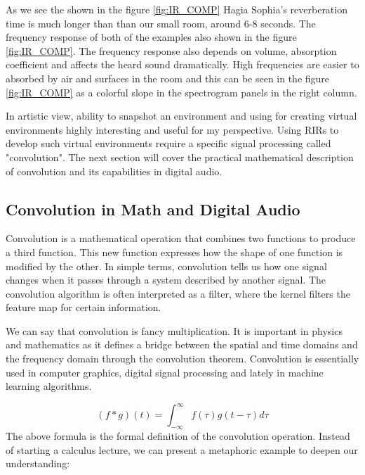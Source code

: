             As we see the shown in the figure \ref{fig:IR_COMP} Hagia Sophia's reverberation time is much longer than than our small room, around 6-8 seconds. The frequency response of both of the examples also shown in the figure \ref{fig:IR_COMP}. The frequency response also depends on volume, absorption coefficient and affects the heard sound dramatically. High frequencies are easier to absorbed by air and surfaces\cite{Room_Acoustics} in the room and this can be seen in the figure \ref{fig:IR_COMP} as a colorful slope in the spectrogram panels in the right column.\par

            In artistic view, ability to snapshot an environment and using for creating virtual environments\cite{Recreation_of_the_Acoustics_of_Hagia_Sophia} highly interesting and useful for my perspective. Using RIRs to develop such virtual environments require a specific signal processing called "convolution". The next section will cover the practical mathematical description of convolution and its capabilities in digital audio.            
        \subsection{Convolution in Math and Digital Audio}
            Convolution is a mathematical operation that combines two functions to produce a third function. This new function expresses how the shape of one function is modified by the other. In simple terms, convolution tells us how one signal changes when it passes through a system described by another signal. The convolution algorithm is often interpreted as a filter, where the kernel filters the feature map for certain information\cite{Deep_Learning_Core_Concepts}.\par

            We can say that convolution is fancy multiplication\cite{Guide_to_Convolution}. It is important in physics and mathematics as it defines a bridge between the spatial and time domains and the frequency domain through the convolution theorem. Convolution is essentially used in computer graphics, digital signal processing and lately in machine learning algorithms.\par
            $$(f \ast g)(t)=\int_{-\infty}^{\infty} f(\tau) g(t-\tau) d \tau$$
            The above formula is the formal definition of the convolution operation. Instead of starting a calculus lecture, we can present a metaphoric example to deepen our understanding:\par

